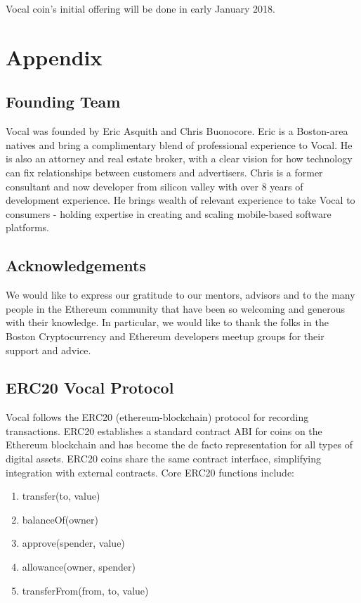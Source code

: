 \documentclass[conference]{IEEEtran}
\begin{document}
   Vocal coin's initial offering will be done in early January 2018.

    
    \section*{Appendix}

    \subsection{Founding Team}
   Vocal was founded by Eric Asquith and Chris Buonocore. Eric is a Boston-area natives and bring a complimentary blend of professional experience to Vocal. He is also an attorney and real estate broker, with a clear vision for how technology can fix relationships between customers and advertisers. Chris is a former consultant and now developer from silicon valley with over 8 years of development experience. He brings wealth of relevant experience to take Vocal to consumers - holding expertise in creating and scaling mobile-based software platforms.  

    \subsection{Acknowledgements}

    We would like to express our gratitude to our mentors, advisors and to the many people in the Ethereum community that have been so welcoming and generous with their knowledge. 
    In particular, we would like to thank the folks in the Boston Cryptocurrency and Ethereum developers meetup groups for their support and advice.

    \subsection{ERC20 Vocal Protocol}
   Vocal follows the ERC20 (ethereum-blockchain) protocol for recording transactions.
    ERC20 establishes a standard contract ABI for coins on the Ethereum blockchain and has become the de facto representation for all types of digital assets. ERC20 coins share the same contract interface, simplifying integration with external contracts.
    Core ERC20 functions include:

    \begin{enumerate}
    \item transfer(to, value)
    \item balanceOf(owner)
    \item approve(spender, value)
    \item allowance(owner, spender)
    \item transferFrom(from, to, value)
    \end{enumerate}
\end{document}
